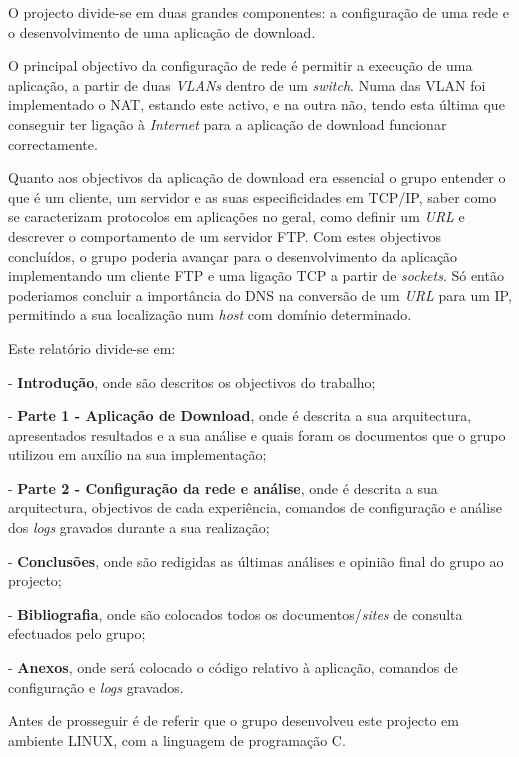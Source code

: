 \documentclass[a4paper]{article}
\begin{document}
O projecto divide-se em duas grandes componentes: a configuração de uma rede e o desenvolvimento de uma aplicação de download.\linebreak

O principal objectivo da configuração de rede é permitir a execução de uma aplicação, a partir de duas \textit{VLANs} dentro de um \textit{switch}. Numa das VLAN foi implementado o NAT, estando este activo, e na outra não, tendo esta última que conseguir ter ligação à \textit{Internet} para a aplicação de download funcionar correctamente.

Quanto aos objectivos da aplicação de download era essencial o grupo entender o que é um cliente, um servidor e as suas especificidades em TCP/IP, saber como se caracterizam protocolos em aplicações no geral, como definir um \textit{URL} e descrever o comportamento de um servidor FTP. Com estes objectivos concluídos, o grupo poderia avançar para o desenvolvimento da aplicação implementando um cliente FTP e uma ligação TCP a partir de \textit{sockets}. Só então poderiamos concluir a importância do DNS na conversão de um \textit{URL} para um IP, permitindo a sua localização num \textit{host} com domínio determinado.\linebreak

Este relatório divide-se em:

- \textbf{Introdução}, onde são descritos os objectivos do trabalho;

- \textbf{Parte 1 - Aplicação de Download}, onde é descrita a sua arquitectura, apresentados resultados e a sua análise e quais foram os documentos que o grupo utilizou em auxílio na sua implementação;

- \textbf{Parte 2 - Configuração da rede e análise}, onde é descrita a sua arquitectura, objectivos de cada experiência, comandos de configuração e análise dos \textit{logs} gravados durante a sua realização;

- \textbf{Conclusões}, onde são redigidas as últimas análises e opinião final do grupo ao projecto;

- \textbf{Bibliografia}, onde são colocados todos os documentos/\textit{sites} de consulta efectuados pelo grupo;

- \textbf{Anexos}, onde será colocado o código relativo à aplicação, comandos de configuração e \textit{logs} gravados.\linebreak

Antes de prosseguir é de referir que o grupo desenvolveu este projecto em ambiente LINUX, com a linguagem de programação C.
\end{document}
